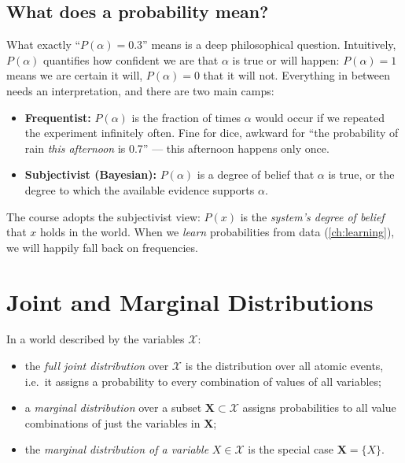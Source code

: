 \documentclass[11pt, oneside]{book}
\newcommand{\Xall}{\mathcal{X}}          %
\newcommand{\bX}{\mathbf{X}}  \newcommand{\bY}{\mathbf{Y}}
\let\originalsection\section
\renewcommand{\section}{\Needspace{7\baselineskip}\originalsection}
\let\originalsubsection\subsection
\renewcommand{\subsection}{\Needspace{6\baselineskip}\originalsubsection}
\begin{document}
\subsection{What does a probability mean?}

What exactly ``$P(\alpha) = 0.3$'' means is a deep philosophical question.
Intuitively, $P(\alpha)$ quantifies how confident we are that $\alpha$ is true
or will happen: $P(\alpha) = 1$ means we are certain it will, $P(\alpha) = 0$
that it will not. Everything in between needs an interpretation, and there are
two main camps:
\begin{itemize}
  \item \textbf{Frequentist:} $P(\alpha)$ is the fraction of times $\alpha$
    would occur if we repeated the experiment infinitely often. Fine for dice,
    awkward for ``the probability of rain \emph{this afternoon} is 0.7'' ---
    this afternoon happens only once.
  \item \textbf{Subjectivist (Bayesian):} $P(\alpha)$ is a degree of belief
    that $\alpha$ is true, or the degree to which the available evidence
    supports $\alpha$.
\end{itemize}
The course adopts the subjectivist view: $P(x)$ is the \emph{system's degree of
belief} that $x$ holds in the world. When we \emph{learn} probabilities from
data (\cref{ch:learning}), we will happily fall back on frequencies.

\section{Joint and Marginal Distributions}

\begin{defbox}[title={Full joint and marginal distributions}]
In a world described by the variables $\Xall$:
\begin{itemize}
  \item the \emph{full joint distribution} over $\Xall$ is the distribution
    over all atomic events, i.e.\ it assigns a probability to every
    combination of values of all variables;
  \item a \emph{marginal distribution} over a subset $\bX \subset \Xall$
    assigns probabilities to all value combinations of just the variables in
    $\bX$;
  \item the \emph{marginal distribution of a variable} $X \in \Xall$ is the
    special case $\bX = \{X\}$.
\end{itemize}
\end{defbox}
\end{document}
